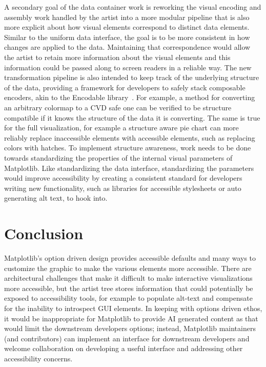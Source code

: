 \documentclass{vgtc}                          %
\begin{document}
A secondary goal of the data container work is reworking the visual encoding and assembly work handled by the artist into a more modular pipeline that is also more explicit about how visual elements correspond to distinct data elements. Similar to the uniform data interface, the goal is to be more consistent in how changes are applied to the data. Maintaining that correspondence would allow the artist to retain more information about the visual elements and this information could be passed along to screen readers in a reliable way. The new transformation pipeline is also intended to keep track of the underlying structure of the data, providing a framework for developers to safely stack composable encoders, akin to the Encodable library~\cite{wongsuphasawatEncodableConfigurableGrammar2020}. For example, a method for converting an arbitrary colormap to a CVD safe one can be verified to be structure compatible if it knows the structure of the data it is converting. The same is true for the full visualization, for example a structure aware pie chart can more reliably replace inaccessible elements with accessible elements, such as replacing colors with hatches. To implement structure awareness, work needs to be done towards standardizing the properties of the internal visual parameters of Matplotlib. Like standardizing the data interface, standardizing the parameters would improve accessibility by creating a consistent standard for developers writing new functionality, such as libraries for accessible stylesheets or auto generating alt text, to hook into. 


\section{Conclusion}
Matplotlib's option driven design provides accessible defaults and many ways to customize the graphic to make the various elements more accessible. There are architectural challenges that make it difficult to make interactive visualizations more accessible, but the artist tree stores information that could potentially be exposed to accessibility tools, for example to populate alt-text and compensate for the inability to introspect GUI elements. In keeping with options driven ethos, it would be inappropriate for Matplotlib to provide AI generated content as that would limit the downstream developers options; instead, Matplotlib maintainers (and contributors) can implement an interface for downstream developers and welcome collaboration on developing a useful interface and addressing other accessibility concerns. 
\end{document}
